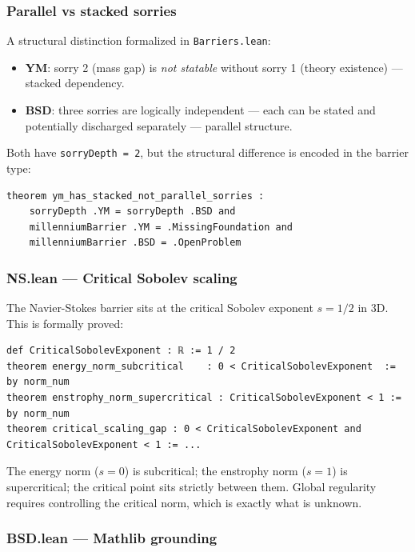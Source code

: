\documentclass[11pt,a4paper]{article}
\begin{document}
\subsubsection{Parallel vs stacked sorries}

A structural distinction formalized in \texttt{Barriers.lean}:

\begin{itemize}
    \item \textbf{YM}: sorry 2 (mass gap) is \emph{not statable} without sorry 1 (theory existence) --- stacked dependency.
    \item \textbf{BSD}: three sorries are logically independent --- each can be stated and potentially discharged separately --- parallel structure.
\end{itemize}

Both have \texttt{sorryDepth = 2}, but the structural difference is encoded in the barrier type:

\begin{lstlisting}[language=lean]
theorem ym_has_stacked_not_parallel_sorries :
    sorryDepth .YM = sorryDepth .BSD and
    millenniumBarrier .YM = .MissingFoundation and
    millenniumBarrier .BSD = .OpenProblem
\end{lstlisting}

\subsubsection{NS.lean --- Critical Sobolev scaling}

The Navier-Stokes barrier sits at the critical Sobolev exponent $s = 1/2$ in 3D. This is formally proved:

\begin{lstlisting}[language=lean]
def CriticalSobolevExponent : ℝ := 1 / 2
theorem energy_norm_subcritical    : 0 < CriticalSobolevExponent  := by norm_num
theorem enstrophy_norm_supercritical : CriticalSobolevExponent < 1 := by norm_num
theorem critical_scaling_gap : 0 < CriticalSobolevExponent and CriticalSobolevExponent < 1 := ...
\end{lstlisting}

The energy norm ($s=0$) is subcritical; the enstrophy norm ($s=1$) is supercritical; the critical point sits strictly between them. Global regularity requires controlling the critical norm, which is exactly what is unknown.

\subsubsection{BSD.lean --- Mathlib grounding}
\end{document}
